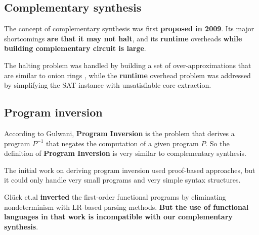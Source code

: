 \documentclass[journal]{IEEEtran}
\begin{document}
\subsection{Complementary synthesis}\label{subsec_compsyn_relat}
The concept of complementary synthesis was first \textbf{proposed in 2009}\cite{ShengYuShen:iccad09}.
Its major shortcomings \textbf{are that it may not halt},
and its \textbf{runtime} overheads \textbf{while building complementary circuit is large}.

The halting problem was handled by building a set of over-approximations that are similar to onion rings \cite{ShengYuShen:fmcad10},
while the \textbf{runtime} overhead problem was addressed by simplifying the SAT instance with unsatisfiable core extraction\cite{ShengYuShen:tcad}.

\subsection{Program inversion}\label{subsec_proinv}
According to Gulwani\cite{dim_syn},
\textbf{Program Inversion} is the problem that derives a program $P^{-1}$
that negates the computation of a given program $P$.
So the definition of \textbf{Program Inversion} is very similar to complementary synthesis.

The initial work on deriving program inversion used proof-based approaches\cite{prog_inv},
but it could only handle very small programs and very simple syntax structures.

Gl\"{u}ck et.al \cite{mtd_autoProginv} \textbf{inverted} the first-order functional programs
by eliminating nondeterminism with LR-based parsing methods.
\textbf{But the use of functional languages in that work is incompatible with our complementary synthesis}.
\end{document}
